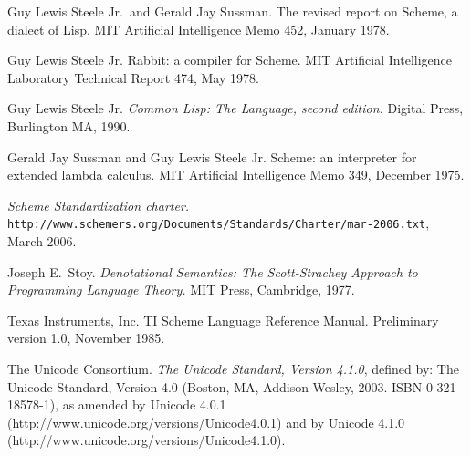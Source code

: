 \begin{thebibliography}{999}
Guy Lewis Steele Jr.~and Gerald Jay Sussman.
The revised report on Scheme, a dialect of Lisp.
MIT Artificial Intelligence Memo 452, January 1978.

Guy Lewis Steele Jr.
Rabbit: a compiler for Scheme.
MIT Artificial Intelligence Laboratory Technical Report 474, May 1978.

Guy Lewis Steele Jr.
{\em Common Lisp: The Language, second edition.}
Digital Press, Burlington MA, 1990.

Gerald Jay Sussman and Guy Lewis Steele Jr.
Scheme: an interpreter for extended lambda calculus.
MIT Artificial Intelligence Memo 349, December 1975.

{\em Scheme Standardization charter.}
{\tt
  http://www.schemers.org/Documents/Standards/Charter/mar-2006.txt},
March 2006.

Joseph E.~Stoy.
{\em Denotational Semantics: The Scott-Strachey Approach to
  Programming Language Theory.}
MIT Press, Cambridge, 1977.

Texas Instruments, Inc.
TI Scheme Language Reference Manual.
Preliminary version 1.0, November 1985. 

The Unicode Consortium.
{\em  The Unicode Standard, Version 4.1.0},
defined by: The Unicode Standard, Version 4.0 (Boston, MA,
Addison-Wesley, 2003. ISBN 0-321-18578-1), as amended by Unicode 4.0.1
({\cf http://www.unicode.org/versions/Unicode4.0.1})
and by Unicode 4.1.0 ({\cf http://www.unicode.org/versions/Unicode4.1.0}).
\end{thebibliography}

